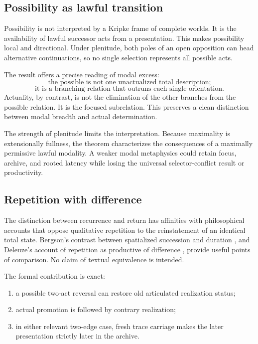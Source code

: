 \documentclass[11pt]{article}
\theoremstyle{definition}
\theoremstyle{remark}
\begin{document}
\subsection{Possibility as lawful transition}

Possibility is not interpreted by a Kripke frame of complete worlds. It is the
availability of lawful successor acts from a presentation. This makes
possibility local and directional. Under plenitude, both poles of an open
opposition can head alternative continuations, so no single selection
represents all possible acts.

The result offers a precise reading of modal excess:
\[
  \text{the possible is not one unactualized total description;}
\]
\[
  \text{it is a branching relation that outruns each single orientation.}
\]
Actuality, by contrast, is not the elimination of the other branches from the
possible relation. It is the focused subrelation. This preserves a clean
distinction between modal breadth and actual determination.

The strength of plenitude limits the interpretation. Because maximality is
extensionally fullness, the theorem characterizes the consequences of a
maximally permissive lawful modality. A weaker modal metaphysics could retain
focus, archive, and rooted latency while losing the universal selector-conflict
result or productivity.

\subsection{Repetition with difference}

The distinction between recurrence and return has affinities with philosophical
accounts that oppose qualitative repetition to the reinstatement of an
identical total state. Bergson's contrast between spatialized succession and
duration \cite{Bergson1911}, and Deleuze's account of repetition as productive
of difference \cite{Deleuze1994}, provide useful points of comparison. No claim
of textual equivalence is intended.

The formal contribution is exact:

\begin{enumerate}
  \item a possible two-act reversal can restore old articulated realization
        status;
  \item actual promotion is followed by contrary realization;
  \item in either relevant two-edge case, fresh trace carriage makes the later
        presentation strictly later in the archive.
\end{enumerate}
\end{document}
